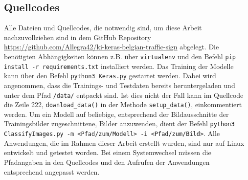 \subsection{Quellcodes}
Alle Dateien und Quellcodes, die notwendig sind, um diese Arbeit nachzuvollziehen sind in dem GitHub Repository \url{https://github.com/Allegra42/ki-keras-belgian-traffic-sign} abgelegt. Die benötigten Abhängigkeiten können z.B. über \texttt{virtualenv} und den Befehl \texttt{pip install -r requirements.txt} installiert werden. Das Training der Modelle kann über den Befehl \texttt{python3\ Keras.py} gestartet werden. Dabei wird angenommen, dass die Trainings- und Testdaten bereits heruntergeladen und unter dem Pfad \texttt{/data/} entpackt sind. Ist dies nicht der Fall kann im Quellcode die Zeile 222, \texttt{download\_data()} in der Methode \texttt{setup\_data()}, einkommentiert werden. Um ein Modell auf beliebige, entsprechend der Bildausschnitte der Trainingsbilder zugeschnittene, Bilder anzuwenden, dient der Befehl \texttt{python3 ClassifyImages.py -m <Pfad/zum/Modell> -i <Pfad/zum/Bild>}. Alle Anwendungen, die im Rahmen dieser Arbeit erstellt wurden, sind nur auf Linux entwickelt und getestet worden. Bei einem Systemwechsel müssen die Pfadangaben in den Quellcodes und den Aufrufen der Anwendungen entsprechend angepasst werden. 
\newpage